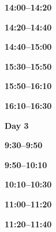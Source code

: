 \documentclass[12pt]{extbook}
\newcommand{\dayheader}[1]{
\clearpage
\begin{center}
\Large\bfseries Day #1
\end{center}
\bigskip}
\newcommand{\breaktime}[1]{
\bigskip
\begin{center}
\Large\bfseries ***** Break #1 *****
\end{center}
\bigskip}
\renewcommand{\breaktime}[1]{}
\newcommand{\abstract}[2]{{
\bigskip
\begin{center}
\large\bfseries #1
\end{center}}
\par

\clearpage
}
\begin{document}
\breaktime{ / Lunch}

\abstract{14:00--14:20}{abstracts/Brennwald} %
\abstract{14:20--14:40}{abstracts/Blanc} %
\abstract{14:40--15:00}{abstracts/Marion} %

\breaktime{30 min}

\abstract{15:30--15:50}{abstracts/Picard} %
\abstract{15:50--16:10}{abstracts/Hillegonds} %
\abstract{16:10--16:30}{abstracts/Engelhardt} %


\dayheader{3}

\abstract{9:30--9:50}{abstracts/Musy} %
\abstract{9:50--10:10}{abstracts/Zhao} %
\abstract{10:10--10:30}{abstracts/GroegerTrampe} %

\breaktime{30 min}


\abstract{11:00--11:20}{abstracts/Iwe} %
\abstract{11:20--11:40}{abstracts/Slagter} %









\end{document}
